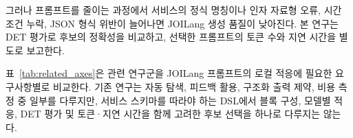 \documentclass[10pt,twocolumn]{article}
\newenvironment{revision}{\begingroup\color{revisionblue}}{\endgroup}
\begin{document}
\begin{revision}
그러나 프롬프트를 줄이는 과정에서 서비스의 정식 명칭이나 인자 자료형 오류, 시간 조건 누락, JSON 형식 위반이 늘어나면 JOILang 생성 품질이 낮아진다. 본 연구는 DET 평가로 후보의 정확성을 비교하고, 선택한 프롬프트의 토큰 수와 지연 시간을 별도로 보고한다.
\end{revision}

\begin{revision}
표~\ref{tab:related_axes}은 관련 연구군을 JOILang 프롬프트의 로컬 적응에 필요한 요구사항별로 비교한다. 기존 연구는 자동 탐색, 피드백 활용, 구조화 출력 제약, 비용 측정 중 일부를 다루지만, 서비스 스키마를 따라야 하는 DSL에서 블록 구성, 모델별 적응, DET 평가 및 토큰·지연 시간을 함께 고려한 후보 선택을 하나로 다루지는 않는다.
\end{revision}
\end{document}
